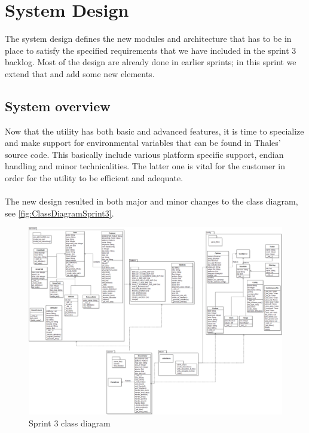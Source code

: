 \section{System Design}
\label{sec:sp3:design}
The system design defines the new modules and architecture that has to be in place to satisfy the specified requirements that we have included in the sprint 3 backlog. Most of the design are already done in earlier sprints; in this sprint we extend that and add some new elements.

\subsection{System overview}
Now that the \gls{utility} has both basic and advanced features, it is time to specialize and make support for environmental variables that can be found in Thales' source code. This basically include various platform specific support, \gls{endian} handling and minor technicalities. The latter one is vital for the customer in order for the \gls{utility} to be efficient and adequate. \\
\\
The new design resulted in both major and minor changes to the class diagram, see \autoref{fig:ClassDiagramSprint3}.
\begin{figure}[!htb]
	\includegraphics[width=\textwidth]{./sprints/img/class_diagram_s3}
	\caption{Sprint 3 class diagram\label{fig:ClassDiagramSprint3}}
\end{figure}

